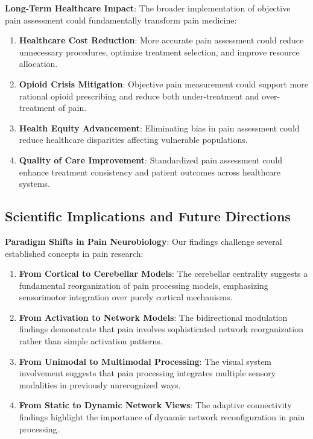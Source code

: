 \textbf{Long-Term Healthcare Impact}:
The broader implementation of objective pain assessment could fundamentally transform pain medicine:

\begin{enumerate}
\item \textbf{Healthcare Cost Reduction}: More accurate pain assessment could reduce unnecessary procedures, optimize treatment selection, and improve resource allocation.

\item \textbf{Opioid Crisis Mitigation}: Objective pain measurement could support more rational opioid prescribing and reduce both under-treatment and over-treatment of pain.

\item \textbf{Health Equity Advancement}: Eliminating bias in pain assessment could reduce healthcare disparities affecting vulnerable populations.

\item \textbf{Quality of Care Improvement}: Standardized pain assessment could enhance treatment consistency and patient outcomes across healthcare systems.
\end{enumerate}

\subsection{Scientific Implications and Future Directions}

\textbf{Paradigm Shifts in Pain Neurobiology}:
Our findings challenge several established concepts in pain research:

\begin{enumerate}
\item \textbf{From Cortical to Cerebellar Models}: The cerebellar centrality suggests a fundamental reorganization of pain processing models, emphasizing sensorimotor integration over purely cortical mechanisms.

\item \textbf{From Activation to Network Models}: The bidirectional modulation findings demonstrate that pain involves sophisticated network reorganization rather than simple activation patterns.

\item \textbf{From Unimodal to Multimodal Processing}: The visual system involvement suggests that pain processing integrates multiple sensory modalities in previously unrecognized ways.

\item \textbf{From Static to Dynamic Network Views}: The adaptive connectivity findings highlight the importance of dynamic network reconfiguration in pain processing.
\end{enumerate}

